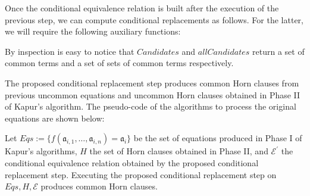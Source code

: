  Once the conditional equivalence relation is built after 
  the execution of the previous step, we can compute conditional
  replacements as follows. For the latter, we will require 
  the following auxiliary functions:

  
  

  By inspection is easy to notice that $Candidates$ 
  and $allCandidates$ return a set of common terms and
  a set of sets of common terms respectively.

  The proposed conditional replacement step produces common Horn 
  clauses from previous uncommon equations and uncommon Horn 
  clauses obtained in Phase II of Kapur's algorithm.
  The pseudo-code of the algorithms to 
  process the original equations are shown below:

  
  

  \begin{lemma} \label{conditional_replacement_lemma}
    Let $Eqs := \{f(\mathfrak{a}_{i, 1}, \dots, \mathfrak{a}_{i, n}) 
    = \mathfrak{a}_i\}$ be the set of equations produced
    in Phase I of Kapur's algorithms, $H$ the set of 
    Horn clauses obtained in Phase II, and $\mathcal{E^{'}}$ the 
    conditional equivalence
    relation obtained by the proposed conditional replacement
    step.
    Executing the proposed conditional replacement step
    on $Eqs, H, \mathcal{E}$ produces common Horn clauses.
  \end{lemma}


